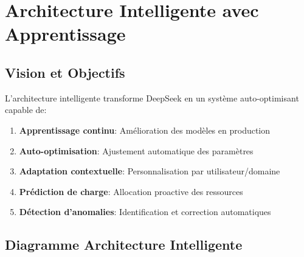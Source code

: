 \documentclass[12pt,a4paper]{article}
\begin{document}
\section{Architecture Intelligente avec Apprentissage}

\subsection{Vision et Objectifs}

L'architecture intelligente transforme DeepSeek en un système auto-optimisant capable de:
\begin{enumerate}
    \item \textbf{Apprentissage continu}: Amélioration des modèles en production
    \item \textbf{Auto-optimisation}: Ajustement automatique des paramètres
    \item \textbf{Adaptation contextuelle}: Personnalisation par utilisateur/domaine
    \item \textbf{Prédiction de charge}: Allocation proactive des ressources
    \item \textbf{Détection d'anomalies}: Identification et correction automatiques
\end{enumerate}

\subsection{Diagramme Architecture Intelligente}
\end{document}
